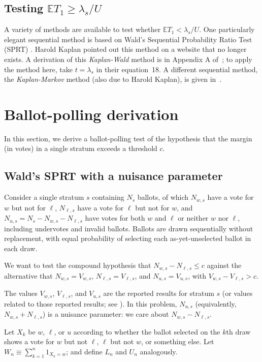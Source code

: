 \documentclass[runningheads]{llncs}
\begin{document}
\subsection{Testing $\mathbb{E} T_1 \ge \lambda_s/U$}

A variety of methods are available to test whether $\mathbb{E} T_1 < \lambda_s/U$.
One particularly elegant sequential method is based on Wald's Sequential Probability
Ratio Test (SPRT) \cite{wald45}.
Harold Kaplan pointed out this method on a website that no longer exists.
A derivation of this \emph{Kaplan-Wald} method is in Appendix A of~\cite{starkTeague14};
to apply the method here, take $t = \lambda_s$ in their equation~18.
A different sequential method, the \emph{Kaplan-Markov} method (also due to Harold Kaplan), 
is given in~\cite{stark09b}.


\section{Ballot-polling derivation}\label{sec:appendix-polling}
In this section, we derive a ballot-polling test of the hypothesis that the margin (in votes) in a single stratum exceeds a threshold $c$. 

\subsection{Wald's SPRT with a nuisance parameter}

Consider a single stratum $s$ containing $N_s$ ballots, of which 
$N_{w,s}$ have a vote for $w$ but not for $\ell$, $N_{\ell,s}$ have a vote for $\ell$ but not for $w$, and $N_{u,s} = N_s - N_{w,s} - N_{\ell,s}$ have votes for both $w$ and $\ell$ or neither $w$ nor $\ell$, including undervotes and invalid ballots.
Ballots are drawn sequentially without replacement, with equal probability of selecting each as-yet-unselected ballot in each draw.

We want to test the compound hypothesis that $N_{w,s} - N_{\ell,s} \le c$ against the alternative that $N_{w,s} = V_{w,s}$, $N_{\ell,s} = V_{\ell,s}$, and $N_{u,s} = V_{u,s}$, with $V_{w,s} - V_{\ell,s} > c$.

The values $V_{w,s}$, $V_{\ell,s}$, and $V_{u,s}$ are the reported results for stratum $s$ 
(or values related to those reported results; see \cite{lindemanEtal12}). 
In this problem, $N_{u,s}$ (equivalently, $N_{w,s} + N_{\ell,s}$) is a nuisance parameter: we care about $ N_{w,s} - N_{\ell,s}$.

Let $X_k$ be $w$, $\ell$, or $u$ according to whether the ballot selected on the $k$th draw 
shows a vote for $w$ but not $\ell$, $\ell$ but not $w$, or something else.
Let $W_n \equiv \sum_{k=1}^n 1_{X_k = w}$; and define $L_n$ and $U_n$ analogously.
\end{document}

